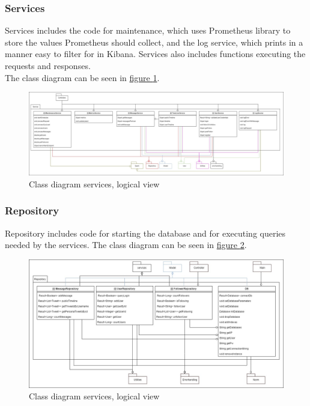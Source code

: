 \subsubsection{Services}
Services includes the code for maintenance, which uses Prometheus library to store the values Prometheus should collect, and the log service, which prints in a manner easy to filter for in Kibana. Services also includes functions executing the requests and responses.\\
The class diagram can be seen in \hyperref[fig:classDiagramServices]{figure \ref{fig:classDiagramServices}}.
 \begin{figure}[H]
    \centering
    \hspace*{-1.5in}
    \includegraphics[width=1.6\textwidth]{images/class_diagram_services.jpg}
    \caption{Class diagram services, logical view}
    \label{fig:classDiagramServices}
\end{figure}

\subsubsection{Repository}
Repository includes code for starting the database and for executing queries needed by the services.
The class diagram can be seen in \hyperref[fig:classDiagramRepository]{figure \ref{fig:classDiagramRepository}}.
\begin{figure}[H]
    \centering
    \hspace*{-1.3in}
    \includegraphics[width=1.55\textwidth]{images/class_diagram_repository.jpg}
    \caption{Class diagram services, logical view}
    \label{fig:classDiagramRepository}
\end{figure}

